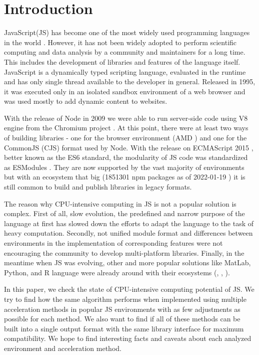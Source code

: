\section{Introduction}\label{sec:introduction}
JavaScript(JS) has become one of the most widely used programming languages in the world \cite{JSSurvey}. However, it has not been widely adopted to perform scientific computing and data analysis by a community and maintainers for a long time. This includes the development of libraries and features of the language itself. JavaScript is a dynamically typed scripting language, evaluated in the runtime and has only single thread available to the developer in general. Released in 1995, it was executed only in an isolated sandbox environment of a web browser \cite{SpeakingJS} and was used mostly to add dynamic content to websites.

With the release of Node \cite{node} in 2009 we were able to run server-side code using V8 engine \cite{V8} from the Chromium project \cite{Chromium}. At this point, there were at least two ways of building libraries - one for the browser environment (AMD \cite{calhoun_2014}) and one for the CommonJS (CJS) \cite{CJS} format used by Node. With the release on ECMAScript 2015 \cite{ES6}, better known as the ES6 standard, the modularity of JS code was standardized as ESModules \cite{ESModules}. They are now supported by the vast majority of environments but with an ecosystem that big (1851301 npm packages as of 2022-01-19 \cite{module_counts}) it is still common to build and publish libraries in legacy formats. 

The reason why CPU-intensive computing in JS is not a popular solution is complex. First of all, slow evolution, the predefined and narrow purpose of the language at first has slowed down the efforts to adapt the language to the task of heavy computation. Secondly, not unified module format and differences between environments in the implementation of corresponding features were not encouraging the community to develop multi-platform libraries. Finally, in the meantime when JS was evolving, other and more popular solutions like MatLab, Python, and R language were already around with their ecosystems (\cite{matlab}, \cite{oliphant2007python}, \cite{gerrard2015mastering}).

In this paper, we check the state of CPU-intensive computing potential of JS. We try to find how the same algorithm performs when implemented using multiple acceleration methods in popular JS environments with as few adjustments as possible for each method. We also want to find if all of these methods can be built into a single output format with the same library interface for maximum compatibility. We hope to find interesting facts and caveats about each analyzed environment and acceleration method.


